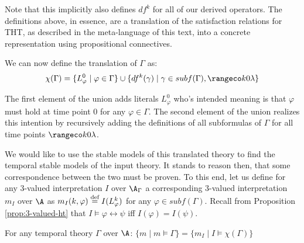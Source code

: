 Note that this implicitly also defines $df^k$ for all of our derived
operators. The definitions above, in essence, are a translation of the
satisfaction relations for THT, as described in the meta-language of
this text, into a concrete representation using propositional
connectives.

We can now define the translation
of $\Gamma$ as:
$$
\chi(\Gamma) = \{ L_\varphi^0 \mid \varphi \in \Gamma \} 
\cup \{ df^k(\gamma) \mid \gamma \in subf(\Gamma), \kinlambda \}
$$

The first element of the union adds literals $L_\varphi^0$ who's
intended meaning is that $\varphi$ must hold at time point $0$ for any
$\varphi \in \Gamma$. The second element of the union realizes this
intention by recursively adding the definitions of all subformulas of
$\Gamma$ for all time points $\kinlambda$.

We would like to use the stable models of this translated theory to
find the temporal stable models of the input theory. It stands to
reason then, that some correspondence between the two must be
proven. To this end, let us define for any 3-valued interpretation $I$
over $\A_{\Gamma}$ a corresponding 3-valued interpretation $m_I$ over $\A$ as
$m_I(k,\varphi) \stackrel{\text{def}}{=} I(L_{\varphi}^k)$ for any $\varphi \in subf(\Gamma)$. Recall from Proposition
\ref{prop:3-valued-ht} that $I \models \varphi \leftrightarrow \psi$
iff $I(\varphi) = I(\psi)$.

\begin{theorem}\label{theorem:translation}
For any temporal theory $\Gamma$ over $\A$: \quad
$\{ m \mid m \models \Gamma \} = \{ m_I \mid I \models \chi(\Gamma) \}$
\end{theorem}

